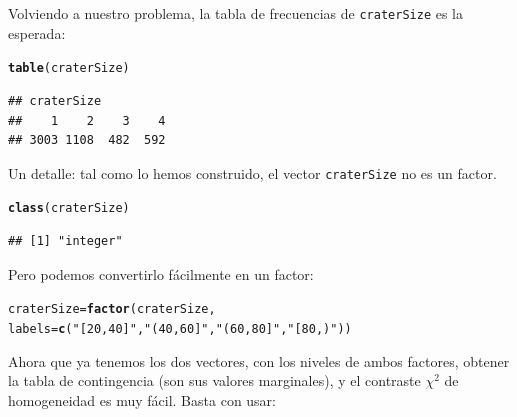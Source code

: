 \documentclass[10pt,a4paper]{article}\usepackage[]{graphicx}\usepackage[]{color}
\makeatletter
\newcommand{\hlstr}[1]{\textcolor[rgb]{0.192,0.494,0.8}{#1}}%
\newcommand{\hlstd}[1]{\textcolor[rgb]{0.345,0.345,0.345}{#1}}%
\newcommand{\hlkwb}[1]{\textcolor[rgb]{0.69,0.353,0.396}{#1}}%
\newcommand{\hlkwc}[1]{\textcolor[rgb]{0.333,0.667,0.333}{#1}}%
\newcommand{\hlkwd}[1]{\textcolor[rgb]{0.737,0.353,0.396}{\textbf{#1}}}%
\newenvironment{kframe}{%
 \def\at@end@of@kframe{}%
 \ifinner\ifhmode%
  \def\at@end@of@kframe{\end{minipage}}%
  \begin{minipage}{\columnwidth}%
 \fi\fi%
 \def\FrameCommand##1{\hskip\@totalleftmargin \hskip-\fboxsep
 \colorbox{shadecolor}{##1}\hskip-\fboxsep
     \hskip-\linewidth \hskip-\@totalleftmargin \hskip\columnwidth}%
 \MakeFramed {\advance\hsize-\width
   \@totalleftmargin\z@ \linewidth\hsize
   \@setminipage}}%
 {\par\unskip\endMakeFramed%
 \at@end@of@kframe}
\newenvironment{knitrout}{}{} %
\newcounter {cont01}
\makeatother
\begin{document}
Volviendo a nuestro problema, la tabla de frecuencias de {\tt craterSize} es la esperada:
\begin{knitrout}
\color{fgcolor}\begin{kframe}
\begin{alltt}
\hlkwd{table}\hlstd{(craterSize)}
\end{alltt}
\begin{verbatim}
## craterSize
##    1    2    3    4 
## 3003 1108  482  592
\end{verbatim}
\end{kframe}
\end{knitrout}

Un detalle: tal como lo hemos construido, el vector {\tt craterSize} no es un factor.

\begin{knitrout}
\color{fgcolor}\begin{kframe}
\begin{alltt}
\hlkwd{class}\hlstd{(craterSize)}
\end{alltt}
\begin{verbatim}
## [1] "integer"
\end{verbatim}
\end{kframe}
\end{knitrout}
Pero podemos convertirlo fácilmente en un factor:
\begin{knitrout}
\color{fgcolor}\begin{kframe}
\begin{alltt}
\hlstd{craterSize} \hlkwb{=} \hlkwd{factor}\hlstd{(craterSize,}
                \hlkwc{labels} \hlstd{=} \hlkwd{c}\hlstd{(}\hlstr{"[20,40]"}\hlstd{,} \hlstr{"(40,60]"}\hlstd{,} \hlstr{"(60,80]"}\hlstd{,} \hlstr{"[80, )"}\hlstd{))}
\end{alltt}
\end{kframe}
\end{knitrout}
Ahora que ya tenemos los dos vectores, con los niveles de ambos factores, obtener la tabla de contingencia (son sus valores marginales), y el contraste $\chi^2$ de homogeneidad es muy fácil. Basta con usar:
\end{document}
